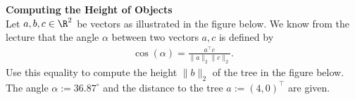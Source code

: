 \textbf{Computing the Height of Objects}\\
Let $a,b,c \in \R^2$ be vectors as illustrated in the figure below. We know from the lecture that the angle $\alpha$ between two vectors $a,c$ is defined by
\begin{align*}
\cos(\alpha) = \frac{a^\top c}{\| a\|_2 \|c \|_2}.
\end{align*}
Use this equality to compute the height $\| b \|_2$ of the tree in the figure below. The angle $\alpha := 36.87^{\circ}$ and the distance to the tree $ a := (4, 0)^\top$ are given.

